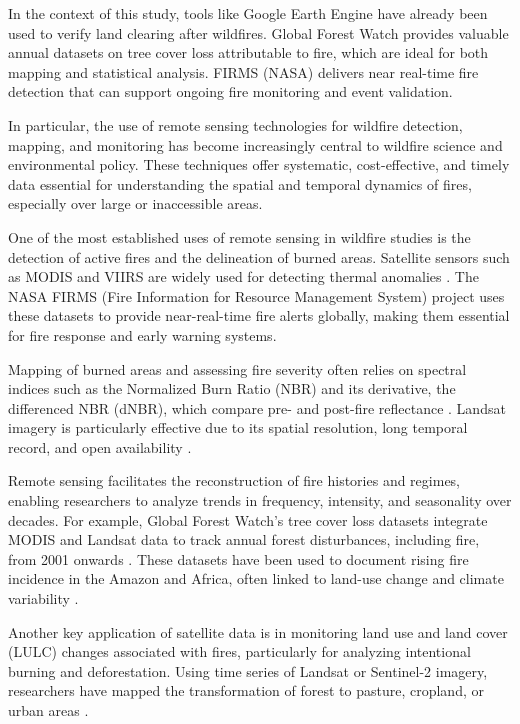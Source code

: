 In the context of this study, tools like Google Earth Engine have already been used to verify land clearing after wildfires. Global Forest Watch provides valuable annual datasets on tree cover loss attributable to fire, which are ideal for both mapping and statistical analysis. FIRMS (NASA) delivers near real-time fire detection that can support ongoing fire monitoring and event validation. 

In particular, the use of remote sensing technologies for wildfire detection, mapping, and monitoring has become increasingly central to wildfire science and environmental policy. These techniques offer systematic, cost-effective, and timely data essential for understanding the spatial and temporal dynamics of fires, especially over large or inaccessible areas.

One of the most established uses of remote sensing in wildfire studies is the detection of active fires and the delineation of burned areas. Satellite sensors such as MODIS and VIIRS are widely used for detecting thermal anomalies \cite{giglio2003}. The NASA FIRMS (Fire Information for Resource Management System) project uses these datasets to provide near-real-time fire alerts globally, making them essential for fire response and early warning systems.

Mapping of burned areas and assessing fire severity often relies on spectral indices such as the Normalized Burn Ratio (NBR) and its derivative, the differenced NBR (dNBR), which compare pre- and post-fire reflectance \cite{key2006,miller2007}. Landsat imagery is particularly effective due to its spatial resolution, long temporal record, and open availability \cite{roy2005}.

Remote sensing facilitates the reconstruction of fire histories and regimes, enabling researchers to analyze trends in frequency, intensity, and seasonality over decades. For example, Global Forest Watch’s tree cover loss datasets integrate MODIS and Landsat data to track annual forest disturbances, including fire, from 2001 onwards \cite{hansen2013}. These datasets have been used to document rising fire incidence in the Amazon and Africa, often linked to land-use change and climate variability \cite{andela2017,aragao2014}.

Another key application of satellite data is in monitoring land use and land cover (LULC) changes associated with fires, particularly for analyzing intentional burning and deforestation. Using time series of Landsat or Sentinel-2 imagery, researchers have mapped the transformation of forest to pasture, cropland, or urban areas \cite{fraser2003,pereira2020}.

